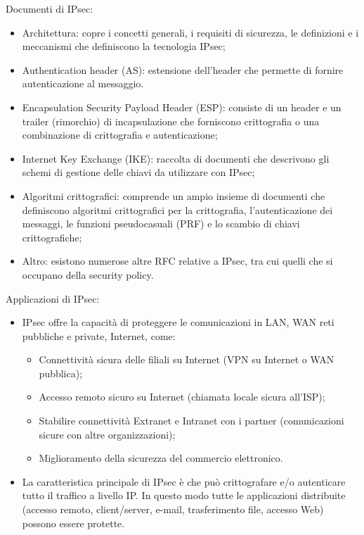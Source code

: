  Documenti di IPsec:
\begin{itemize}
    \item Architettura: copre i concetti generali, i requisiti di sicurezza, le definizioni e i meccanismi che definiscono la tecnologia IPsec;
	\item Authentication header (AS): estensione dell'header che permette di fornire autenticazione al messaggio.
	\item Encapsulation Security Payload Header (ESP): consiste di un header e un trailer (rimorchio) di incapsulazione che forniscono crittografia o una combinazione di crittografia e autenticazione;
	\item Internet Key Exchange (IKE): raccolta di documenti che descrivono gli schemi di gestione delle chiavi da utilizzare con IPsec;
	\item Algoritmi crittografici: comprende un ampio insieme di documenti che definiscono algoritmi crittografici per la crittografia, l'autenticazione dei messaggi, le funzioni pseudocasuali (PRF) e lo scambio di chiavi crittografiche;
	\item Altro: esistono numerose altre RFC relative a IPsec, tra cui quelli che si occupano della security policy.
\end{itemize}

Applicazioni di IPsec:
\begin{itemize}
    \item IPsec offre la capacità di proteggere le comunicazioni in LAN, WAN reti pubbliche e private, Internet, come:
	\begin{itemize}
	    \item Connettività sicura delle filiali su Internet (VPN su Internet o WAN pubblica);
		\item Accesso remoto sicuro su Internet (chiamata locale sicura all'ISP);
		\item Stabilire connettività Extranet e Intranet con i partner (comunicazioni sicure con altre organizzazioni);
		\item Miglioramento della sicurezza del commercio elettronico.
	\end{itemize}
	\item La caratteristica principale di IPsec è che può crittografare e/o autenticare tutto il traffico a livello IP. In questo modo tutte le applicazioni distribuite (accesso remoto, client/server, e-mail, trasferimento file, accesso Web) possono essere protette.
\end{itemize}


